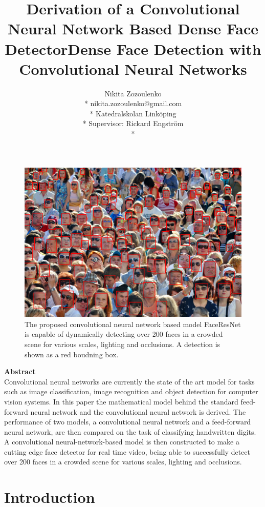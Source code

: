 \documentclass[a4paper, twoside]{article}
\title{Derivation of a Convolutional Neural Network Based Dense Face Detector}
\title{Dense Face Detection with Convolutional Neural Networks}
\author{Nikita Zozoulenko \\*
nikita.zozoulenko@gmail.com \\*
Katedralskolan Linköping\\*
Supervisor: Rickard Engström \\*}
\begin{document}
\maketitle

\vfill
\begin{figure}[h]
	\centering
  		\includegraphics[scale=0.221]{resultscrowd2.png}
  	\caption{The proposed convolutional neural network based model FaceResNet is capable of dynamically detecting over 200 faces in a crowded scene for various scales, lighting and occlusions. A detection is shown as a red boudning box.} \label{crowd}
\end{figure}
\vfill

\newpage

\Large{\textbf{Abstract}}\\

Convolutional neural networks are currently the state of the art model for tasks such as image classification, image recognition and object detection for computer vision systems. In this paper the mathematical model behind the standard feed-forward neural network and the convolutional neural network is derived. The performance of two models, a convolutional neural network and a feed-forward neural network, are then compared on the task of classifying handwritten digits. A convolutional neural-network-based model is then constructed to make a cutting edge face detector for real time video, being able to successfully detect over 200 faces in a crowded scene for various scales, lighting and occlusions.
\newpage

\tableofcontents
\newpage
\section{Introduction}
\end{document}
